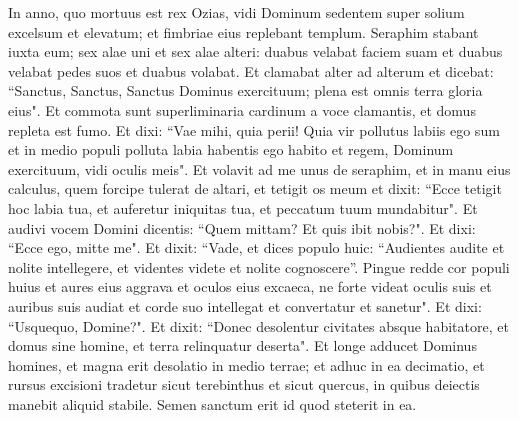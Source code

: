 \begin{biblechapter}  
\verse In anno, quo mortuus est rex Ozias, vidi Dominum sedentem super solium excelsum et elevatum; et fimbriae eius replebant templum. 
\verse Seraphim stabant iuxta eum; sex alae uni et sex alae alteri: duabus velabat faciem suam et duabus velabat pedes suos et duabus volabat. 
\verse Et clamabat alter ad alterum et dicebat: “Sanctus, Sanctus, Sanctus Dominus exercituum; plena est omnis terra gloria eius". 
\verse Et commota sunt superliminaria cardinum a voce clamantis, et domus repleta est fumo. 
\verse Et dixi: “Vae mihi, quia perii! Quia vir pollutus labiis ego sum et in medio populi polluta labia habentis ego habito et regem, Dominum exercituum, vidi oculis meis". 
\verse Et volavit ad me unus de seraphim, et in manu eius calculus, quem forcipe tulerat de altari, 
\verse et tetigit os meum et dixit: “Ecce tetigit hoc labia tua, et auferetur iniquitas tua, et peccatum tuum mundabitur". 
\verse Et audivi vocem Domini dicentis: “Quem mittam? Et quis ibit nobis?". Et dixi: “Ecce ego, mitte me". 
\verse Et dixit: “Vade, et dices populo huic: “Audientes audite et nolite intellegere, et videntes videte et nolite cognoscere”. 
\verse Pingue redde cor populi huius et aures eius aggrava et oculos eius excaeca, ne forte videat oculis suis et auribus suis audiat et corde suo intellegat et convertatur et sanetur". 
\verse Et dixi: “Usquequo, Domine?". Et dixit: “Donec desolentur civitates absque habitatore, et domus sine homine, et terra relinquatur deserta". 
\verse Et longe adducet Dominus homines, et magna erit desolatio in medio terrae; 
\verse et adhuc in ea decimatio, et rursus excisioni tradetur sicut terebinthus et sicut quercus, in quibus deiectis manebit aliquid stabile. Semen sanctum erit id quod steterit in ea. 
\end{biblechapter}

